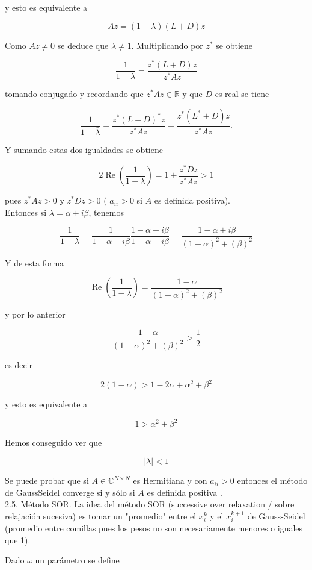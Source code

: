 \documentclass[10pt]{article}
\begin{document}
y esto es equivalente a

$$
A z=(1-\lambda)(L+D) z
$$

Como $A z \neq 0$ se deduce que $\lambda \neq 1$. Multiplicando por $z^{*}$ se obtiene

$$
\frac{1}{1-\lambda}=\frac{z^{*}(L+D) z}{z^{*} A z}
$$

tomando conjugado y recordando que $z^{*} A z \in \mathbb{R}$ y que $D$ es real se tiene

$$
\frac{1}{1-\bar{\lambda}}=\frac{z^{*}(L+D)^{*} z}{z^{*} A z}=\frac{z^{*}\left(L^{*}+D\right) z}{z^{*} A z} .
$$

Y sumando estas dos igualdades se obtiene

$$
2 \operatorname{Re}\left(\frac{1}{1-\lambda}\right)=1+\frac{z^{*} D z}{z^{*} A z}>1
$$

pues $z^{*} A z>0$ y $z^{*} D z>0$ ( $a_{i i}>0$ si $A$ es definida positiva).\\
Entonces si $\lambda=\alpha+i \beta$, tenemos

$$
\frac{1}{1-\lambda}=\frac{1}{1-\alpha-i \beta} \frac{1-\alpha+i \beta}{1-\alpha+i \beta}=\frac{1-\alpha+i \beta}{(1-\alpha)^{2}+(\beta)^{2}}
$$

Y de esta forma

$$
\operatorname{Re}\left(\frac{1}{1-\lambda}\right)=\frac{1-\alpha}{(1-\alpha)^{2}+(\beta)^{2}}
$$

y por lo anterior

$$
\frac{1-\alpha}{(1-\alpha)^{2}+(\beta)^{2}}>\frac{1}{2}
$$

es decir

$$
2(1-\alpha)>1-2 \alpha+\alpha^{2}+\beta^{2}
$$

y esto es equivalente a

$$
1>\alpha^{2}+\beta^{2}
$$

Hemos conseguido ver que

$$
|\lambda|<1
$$

Se puede probar que si $A \in \mathbb{C}^{N \times N}$ es Hermitiana y con $a_{i i}>0$ entonces el método de GaussSeidel converge si y sólo si $A$ es definida positiva .\\
2.5. Método SOR. La idea del método SOR (successive over relaxation / sobre relajación sucesiva) es tomar un "promedio" entre el $x_{i}^{k}$ y el $x_{i}^{k+1}$ de Gauss-Seidel (promedio entre comillas pues los pesos no son necesariamente menores o iguales que 1).

Dado $\omega$ un parámetro se define
\end{document}
